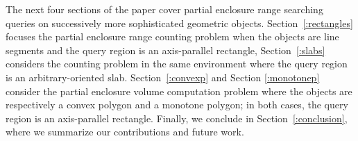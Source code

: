 \documentclass[a4paper,11pt]{article}
\begin{document}
The next four sections of the paper cover partial enclosure 
range searching queries on successively more sophisticated 
geometric objects. Section~\ref{:rectangles} focuses the 
partial enclosure range counting problem when the objects 
are line segments and the query region is an axis-parallel 
rectangle, Section~\ref{:slabs} considers the counting problem 
in the same environment where the query region is an 
arbitrary-oriented slab. Section~\ref{:convexp} and Section 
\ref{:monotonep} consider the partial enclosure volume 
computation problem where the objects are respectively 
a convex polygon and a monotone polygon; in both cases, the 
query region is an axis-parallel rectangle. Finally, we 
conclude in Section~\ref{:conclusion}, where we summarize our 
contributions and future work. 



%
%
%


\end{document}
